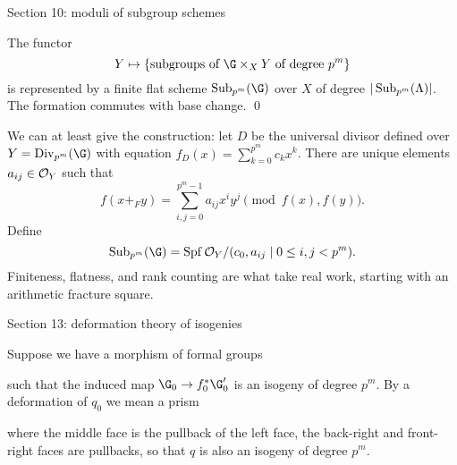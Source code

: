 Section 10: moduli of subgroup schemes

\begin{theorem}
The functor \[Y \mapsto \{\text{subgroups of $\G \times_X Y$ of degree $p^m$}\}\] is represented by a finite flat scheme $\Sub_{p^m}(\G)$ over $X$ of degree $|\operatorname{Sub}_{p^m}(\Lambda)|$.  The formation commutes with base change. \qed
\end{theorem}

We can at least give the construction: let $D$ be the universal divisor defined over $Y = \Div_{p^m}(\G)$ with equation $f_D(x) = \sum_{k=0}^{p^m} c_k x^k$.  There are unique elements $a_{ij} \in \mathcal{O}_Y$ such that \[f(x +_F y) = \sum_{i,j=0}^{p^m-1} a_{ij} x^i y^j \pmod{f(x), f(y)}.\]  Define \[\Sub_{p^m}(\G) = \Spf \sheaf O_Y / (c_0, a_{ij} \mid 0 \le i, j < p^m).\]  Finiteness, flatness, and rank counting are what take real work, starting with an arithmetic fracture square.

Section 13: deformation theory of isogenies

\begin{definition}
Suppose we have a morphism of formal groups
\begin{center}
\end{center}
such that the induced map $\G_0 \to f_0^* \G'_0$ is an isogeny of degree $p^m$.  By a deformation of $q_0$ we mean a prism
\begin{center}
\end{center}
where the middle face is the pullback of the left face, the back-right and front-right faces are pullbacks, so that $q$ is also an isogeny of degree $p^m$.
\end{definition}

